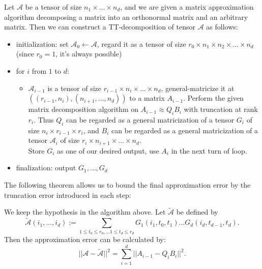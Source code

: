 \documentclass[12pt]{article}
\begin{document}
\begin{myalgo}
Let $\mathcal{A}$ be a tensor of size $n_1 \times \dots \times n_d$, and we are given a matrix approximation algorithm decomposing a matrix into an orthonormal matrix and an arbitrary matrix. Then we can construct a TT-decomposition of tensor $\mathcal{A}$ as follows:
\begin{itemize}
\item initialization: set $\mathcal{A}_0 \leftarrow \mathcal{A}$, regard it as a tensor of size $r_0 \times n_1 \times n_2 \times \dots \times n_d$ (since $r_0 = 1$, it's always possible)
\item for $i$ from $1$ to $d$:
	\begin{itemize}
		\item $\mathcal{A}_{i-1}$ is a tensor of size $r_{i-1} \times n_i \times \dots \times n_d$, general-matricize it at $((r_{i-1}, n_i), (n_{i+1}, \dots, n_d))$ to a matrix $A_{i-1}$. Perform the given matrix decomposition algorithm on $A_{i-1} \approx Q_iB_i$ with truncation at rank $r_i$. Thus $Q_i$ can be regarded as a general matricization of a tensor $G_i$ of size $n_i \times r_{i-1} \times r_i$, and $B_i$ can be regarded as a general matricization of a tensor $\mathcal{A}_i$ of size $r_i \times n_{i+1} \times \dots \times n_d$. \\
		Store $G_i$ as one of our desired output, use $A_i$ in the next turn of loop.
	\end{itemize}
\item finalization: output $G_1, \dots, G_d$
\end{itemize}
\end{myalgo}

The following theorem allows us to bound the final approximation error by the truncation error introduced in each step:

\begin{mythm}
\label{tterror}
We keep the hypothesis in the algorithm above. Let $\tilde{\mathcal{A}}$ be defined by 
$$ \tilde{\mathcal{A}} (i_1, \dots, i_d) :=  \sum_{1 \leq t_0 \leq r_0, \dots 1 \leq t_d \leq r_d} G_1(i_1, t_0, t_1) \dots G_d(i_d, t_{d-1}, t_d).$$
Then the approximation error can be calculated by:
$$ || \mathcal{A} - \tilde{\mathcal{A}} || ^ 2 = \sum_{i=1}^d || A_{i-1} - Q_iB_i || ^ 2. $$
\end{mythm}
\end{document}
